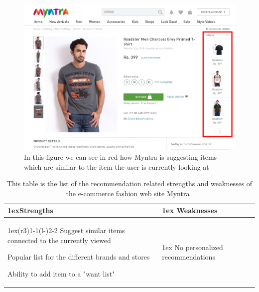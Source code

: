     \begin{figure}[H]
        \centering
        \includegraphics[width=5in]{image/myntiaSimilarExample.png}
        \caption[Example of Myntra's "similar item" approach]{In this figure we can see in red how Myntra is suggesting items which are similar to the item the user is currently looking at}
        \label{figure:myntiaSimilarEx}
    \end{figure}

    \begin{table}[H]
        \centering
        \begin{tabularx}{\linewidth}{>{\parskip1ex}X@{\kern4\tabcolsep}>{\parskip1ex}X}
            \toprule
            \hfil\bfseries Strengths
            &
            \hfil\bfseries Weaknesses
            \\\cmidrule(r{3\tabcolsep}){1-1}\cmidrule(l{-\tabcolsep}){2-2}
	        Suggest similar items connected to the currently viewed \par
            Popular list for the different brands and stores \par
            Ability to add item to a "want list"\par
            &
            No personalized recommendations \par
            \\\bottomrule
        \end{tabularx}
        \caption[Recommendation related strengths and weaknesses of Myntra~\cite{myntra}]{This table is the list of the recommendation related strengths and weaknesses of the e-commerce fashion web site Myntra~\cite{myntra}}
        \label{table:ecommerceMyntra}
    \end{table}

